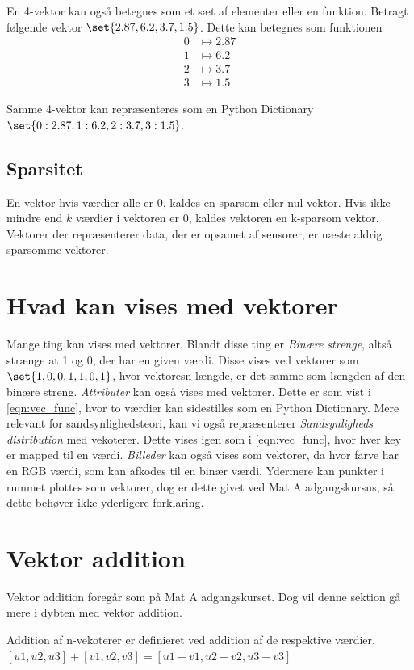 En 4-vektor kan også betegnes som et sæt af elementer eller en funktion.
Betragt følgende vektor $\set{2.87,6.2,3.7,1.5}$.
Dette kan betegnes som funktionen
\begin{align}
	\label{eqn:vec_func}
	0&\mapsto 2.87\\
	1&\mapsto 6.2\\
	2&\mapsto 3.7\\
	3&\mapsto 1.5
\end{align}

Samme 4-vektor kan repræsenteres som en Python Dictionary $\set{0:2.87, 1:6.2, 2:3.7, 3:1.5}$.

\subsection{Sparsitet}
En vektor hvis værdier alle er 0, kaldes en sparsom eller nul-vektor.
Hvis ikke mindre end $k$ værdier i vektoren er 0, kaldes vektoren en k-sparsom vektor.
Vektorer der repræsenterer data, der er opsamet af sensorer, er næste aldrig sparsomme vektorer.

\section{Hvad kan vises med vektorer}
Mange ting kan vises med vektorer.
Blandt disse ting er \emph{Binære strenge}, altså strænge at 1 og 0, der har en given værdi.
Disse vises ved vektorer som $\set{1,0,0,1,1,0,1}$, hvor vektoresn længde, er det samme som længden af den binære streng.
\emph{Attributer} kan også vises med vektorer.
Dette er som vist i \cref{eqn:vec_func}, hvor to værdier kan sidestilles som en Python Dictionary.
Mere relevant for sandsynlighedsteori, kan vi også repræsenterer \emph{Sandsynligheds distribution} med vekoterer.
Dette vises igen som i \cref{eqn:vec_func}, hvor hver key er mapped til en værdi.
\emph{Billeder} kan også vises som vektorer, da hvor farve har en RGB værdi, som kan afkodes til en binær værdi.
Ydermere kan punkter i rummet plottes som vektorer, dog er dette givet ved Mat A adgangskursus, så dette behøver ikke yderligere forklaring.

\section{Vektor addition}
Vektor addition foregår som på Mat A adgangskurset.
Dog vil denne sektion gå mere i dybten med vektor addition.


\begin{frdef}[KLEIN s.
69]
	Addition af n-vekoterer er definieret ved addition af de respektive værdier.\\
	$[u1,u2,u3] + [v1,v2,v3] = [u1+v1, u2+v2, u3+v3]$
\end{frdef}

